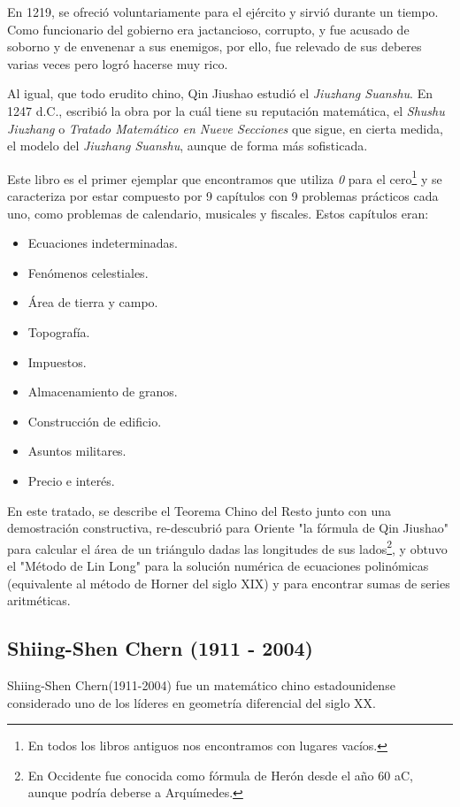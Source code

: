 \documentclass[a4paper, 11pt]{article}
\begin{document}
		En 1219, se ofreció voluntariamente para el ejército y sirvió durante un tiempo. Como funcionario del gobierno
		era jactancioso, corrupto, y fue acusado de soborno y de envenenar a sus enemigos, por ello, fue relevado de sus
		deberes varias veces pero logró hacerse muy rico.
		
		Al igual, que todo erudito chino, Qin Jiushao estudió el \textit{Jiuzhang Suanshu}. En 1247 d.C., escribió la
		obra por la cuál tiene su reputación matemática, el \textit{Shushu Jiuzhang} o \textit{Tratado Matemático en Nueve
		Secciones} que sigue, en cierta medida, el modelo del \textit{Jiuzhang Suanshu}, aunque de forma más sofisticada.
		
		Este libro es el primer ejemplar que encontramos que utiliza \textit{0} para el cero\footnote{En todos los libros
		antiguos nos encontramos con lugares vacíos.} y se caracteriza por estar compuesto por 9 capítulos con 9 problemas
		prácticos cada uno, como problemas de calendario, musicales y fiscales. Estos capítulos eran:
		\begin{itemize}
			\item Ecuaciones indeterminadas.
			\item Fenómenos celestiales.
			\item Área de tierra y campo.
			\item Topografía.
			\item Impuestos.
			\item Almacenamiento de granos.
			\item Construcción de edificio.
			\item Asuntos militares.
			\item Precio e interés.
		\end{itemize}
		
		En este tratado, se describe el Teorema Chino del Resto junto con una demostración constructiva, re-descubrió
		para Oriente "la fórmula de Qin Jiushao" para calcular el área de un triángulo dadas las longitudes de sus
		lados\footnote{En Occidente fue conocida como fórmula de Herón desde el año 60 aC, aunque podría deberse a
		Arquímedes.}, y obtuvo el "Método de Lin Long" para la solución numérica de ecuaciones polinómicas (equivalente
		al método de Horner del siglo XIX) y para encontrar sumas de series aritméticas.
	
	\subsection{Shiing-Shen Chern (1911 - 2004)}
		Shiing-Shen Chern(1911-2004) fue un matemático chino estadounidense considerado uno de los líderes en geometría
		diferencial del siglo XX.
		
\end{document}
